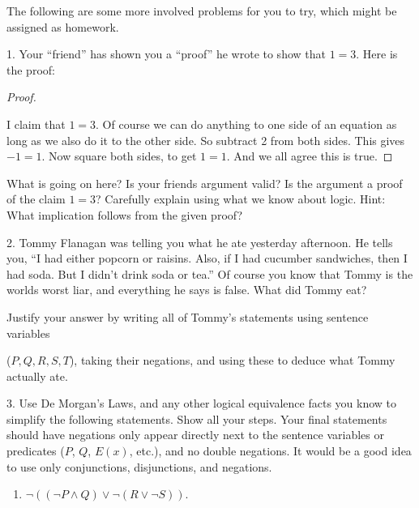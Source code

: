 \documentclass[10pt,]{book}
\theoremstyle{plain}
\theoremstyle{definition}
\theoremstyle{definition}
\theoremstyle{definition}
\numberwithin{equation}{chapter}
\begin{document}
      The following are some more involved problems for you to try, which might be assigned as homework.
\begin{exerciselist}
\item[1.]\hypertarget{exercise-255}{}
            Your ``friend'' has shown you a ``proof'' he wrote to show that \(1 = 3\). Here is the proof:
\begin{proof}\hypertarget{proof-54}{}

              I claim that \(1 = 3\). Of course we can do anything to one side of an equation as long as we also do it to the other side. So subtract 2 from both sides. This gives \(-1 = 1\). Now square both sides, to get \(1 = 1\). And we all agree this is true.
\end{proof}
\par

            What is going on here? Is your friends argument valid? Is the argument a proof of the claim \(1=3\)? Carefully explain using what we know about logic. Hint: What implication follows from the given proof?
\par\smallskip
\item[2.]\hypertarget{exercise-256}{}
            Tommy Flanagan was telling you what he ate yesterday afternoon. He tells you, ``I had either popcorn or raisins. Also, if I had cucumber sandwiches, then I had soda. But I didn't drink soda or tea.'' Of course you know that Tommy is the worlds worst liar, and everything he says is false. What did Tommy eat?
\par

            Justify your answer by writing all of Tommy's statements using sentence variables
\par

            (\(P, Q, R, S, T\)), taking their negations, and using these to deduce what Tommy actually ate.
\par\smallskip
\item[3.]\hypertarget{exercise-257}{}
            Use De Morgan's Laws, and any other logical equivalence facts you know to simplify the following statements. Show all your steps. Your final statements should have negations only appear directly next to the sentence variables or predicates (\(P\), \(Q\), \(E(x)\), etc.), and no double negations. It would be a good idea to use only conjunctions, disjunctions, and negations.
\leavevmode%
\begin{enumerate}[label=(\alph*)]
\item\hypertarget{li-1181}{}\(\neg((\neg P \wedge Q) \vee \neg(R \vee \neg S))\).


\end{enumerate}
\end{exerciselist}
\end{document}
